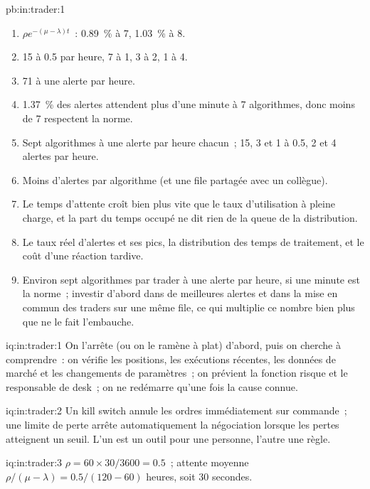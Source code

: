 \begin{solution}{pb:in:trader:1}
\begin{enumerate}
minute.
\item $\rho e^{-(\mu-\lambda)t}$~: 0.89~\% à 7, 1.03~\% à 8.
\item 15 à 0.5 par heure, 7 à 1, 3 à 2, 1 à 4.
\item 71 à une alerte par heure.
\item 1.37~\% des alertes attendent plus d'une minute à 7 algorithmes, donc moins de 7 respectent la norme.
\item Sept algorithmes à une alerte par heure chacun~; 15, 3 et 1 à 0.5, 2 et 4 alertes par heure.
\item Moins d'alertes par algorithme (et une file partagée avec un collègue).
\item Le temps d'attente croît bien plus vite que le taux d'utilisation à pleine charge, et la part du temps occupé ne dit rien de la queue de la distribution.
\item Le taux réel d'alertes et ses pics, la distribution des temps de traitement, et le coût d'une réaction tardive.
\item Environ sept algorithmes par trader à une alerte par heure, si une minute est la norme~; investir d'abord dans de meilleures alertes et dans
la mise en commun des traders sur une même file, ce qui multiplie ce nombre bien plus que ne le fait l'embauche.
\end{enumerate}
\end{solution}

\begin{solution}{iq:in:trader:1}
On l'arrête (ou on le ramène à plat) d'abord, puis on cherche à comprendre~: on vérifie les positions, les exécutions récentes, les données de marché et les changements de paramètres~;
on prévient la fonction risque et le responsable de desk~; on ne redémarre qu'une fois la cause connue.
\end{solution}

\begin{solution}{iq:in:trader:2}
Un kill switch annule les ordres immédiatement sur commande~; une limite de perte arrête automatiquement la négociation lorsque les pertes atteignent un seuil.
L'un est un outil pour une personne, l'autre une règle.
\end{solution}

\begin{solution}{iq:in:trader:3}
$\rho=60\times30/3600=0.5$~; attente moyenne $\rho/(\mu-\lambda)=0.5/(120-60)$ heures, soit 30 secondes.
\end{solution}

